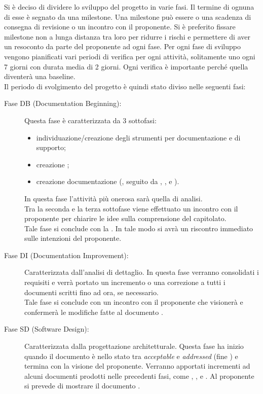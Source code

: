 	Si è deciso di dividere lo sviluppo del progetto in varie fasi. Il termine di ognuna di esse è segnato da una milestone. Una milestone può essere o una scadenza di consegna di revisione o un incontro con il proponente. Si è preferito fissare milestone non a lunga distanza tra loro per ridurre i rischi e permettere di aver un resoconto da parte del proponente ad ogni fase. Per ogni fase di sviluppo vengono pianificati vari periodi di verifica per ogni attività, solitamente uno ogni 7 giorni con durata media di 2 giorni. Ogni verifica è importante perché quella diventerà una baseline.\\
	Il periodo di svolgimento del progetto è quindi stato diviso nelle seguenti fasi:
	\begin{description}
		\item[Fase DB (Documentation Beginning):] Questa fase è caratterizzata da 3 sottofasi:
			\begin{itemize}
				\item individuazione/creazione degli strumenti per documentazione e di supporto;
				\item creazione ;
				\item creazione documentazione (, seguito da , ,  e ).
			\end{itemize}
			In questa fase l'attività più onerosa sarà quella di analisi.\\Tra la seconda e la terza sottofase viene effettuato un incontro con il proponente per chiarire le idee sulla comprensione del capitolato.\\Tale fase si conclude con la . In tale modo si avrà un riscontro immediato sulle intenzioni del proponente.
		\item[Fase DI (Documentation Improvement):] Caratterizzata dall’analisi di dettaglio. In questa fase verranno consolidati i requisiti  e verrà portato un incremento o una correzione a tutti i documenti scritti fino ad ora, se necessario.\\Tale fase si conclude con un incontro con il proponente che visionerà e confermerà le modifiche fatte al documento .
		\item[Fase SD (Software Design):] Caratterizzata dalla progettazione architetturale. Questa fase ha inizio quando il documento  è nello stato tra \textit{acceptable} e \textit{addressed} (fine ) e termina con la visione del proponente. Verranno apportati incrementi ad alcuni documenti prodotti nelle precedenti fasi, come , ,  e . Al proponente si prevede di mostrare il documento .

\end{description}
